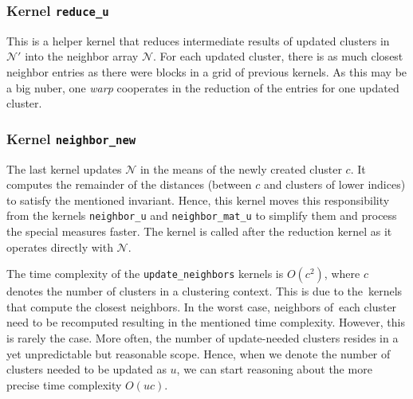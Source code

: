 \subsubsection{Kernel \texttt{reduce\_u}} This is a helper kernel that reduces intermediate results of updated clusters in~$\mathcal{N}'$ into the neighbor array $\mathcal{N}$. For each updated cluster, there is as much closest neighbor entries as there were blocks in a grid of previous kernels. As this may be a big nuber, one \emph{warp} cooperates in the reduction of the entries for one updated cluster.

\subsubsection{Kernel \texttt{neighbor\_new}} The last kernel updates $\mathcal{N}$ in the means of the newly created cluster $c$. It computes the remainder of the distances (between $c$ and clusters of lower indices) to satisfy the mentioned invariant. Hence, this kernel moves this responsibility from the kernels \texttt{neighbor\_u} and \texttt{neighbor\_mat\_u} to simplify them and process the special measures faster. The kernel is called after the reduction kernel as it operates directly with $\mathcal{N}$. 

\begin{rem}
	The time complexity of the \texttt{update\_neighbors} kernels is $O(c^2)$, where $c$ denotes the number of clusters in a clustering context. This is due to the~kernels that compute the closest neighbors. In the worst case, neighbors of~each cluster need to be recomputed resulting in the mentioned time complexity. However, this is rarely the case. More often, the number of update-needed clusters resides in a yet unpredictable but reasonable scope. Hence, when we denote the number of clusters needed to be updated as $u$, we can start reasoning about the more precise time complexity $O(uc)$.
\end{rem}

